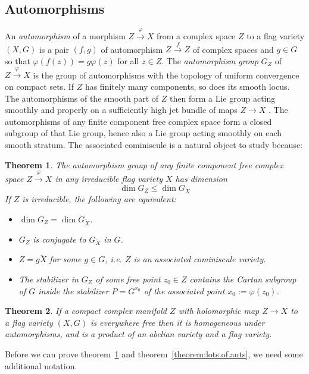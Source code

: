 \documentclass[a4paper,10pt]{amsart}
\newtheorem{theorem}{Theorem}
\theoremstyle{remark}
\begin{document}
\subsection{Automorphisms}\label{subsection:Freedom}
An \emph{automorphism} of a morphism \(Z\xrightarrow{\varphi}X\) from a complex space \(Z\) to a flag variety \((X,G)\) is a pair \((f,g)\) of automorphism \(Z\xrightarrow{f}Z\) of complex spaces and \(g\in G\) so that \(\varphi(f(z))=g\varphi(z)\) for all \(z\in Z\).
The \emph{automorphism group} \(G_Z\) of \(Z\xrightarrow{\varphi}X\) is the group of automorphisms with the topology of uniform convergence on compact sets.
If \(Z\) has finitely many components, so does its smooth locus.
The automorphisms of the smooth part of \(Z\) then form a Lie group acting smoothly and properly on a sufficiently high jet bundle of maps \(Z\to X\) \cite{mckay2023introduction}.
The automorphisms of any finite component free complex space form a closed subgroup of that Lie group, hence also a Lie group acting smoothly on each smooth stratum.
The associated cominiscule is a natural object to study because:
\begin{theorem}\label{theorem:freedom}
The automorphism group of any finite component free complex space \(Z\xrightarrow{\varphi}X\) in any irreducible flag variety \(X\) has dimension 
\[
\dim G_Z\le \dim G_{\breve{X}}
\]
If \(Z\) is irreducible, the following are equivalent:
\begin{itemize}
\item
\(\dim G_Z=\dim G_{\breve{X}}\).
\item
\(G_Z\) is conjugate to \(G_{\breve{X}}\) in \(G\).
\item
\(Z=g\breve{X}\) for some \(g\in G\), i.e. \(Z\) is an associated cominiscule variety.
\item
The stabilizer in \(G_Z\) of some free point \(z_0\in Z\) contains the Cartan subgroup of \(G\) inside the stabilizer \(P=G^{x_0}\) of the associated point \(x_0:=\varphi(z_0)\).
\end{itemize}
\end{theorem}
\begin{theorem}\label{theorem:lots.of.auts}
If a compact complex manifold \(Z\) with holomorphic map \(Z\to X\) to a flag variety \((X,G)\) is everywhere free then it is homogeneous under automorphisms, and is a product of an abelian variety and a flag variety.
\end{theorem}
Before we can prove theorem~\ref{theorem:freedom} and theorem~\vref{theorem:lots.of.auts}, we need some additional notation.
\end{document}
